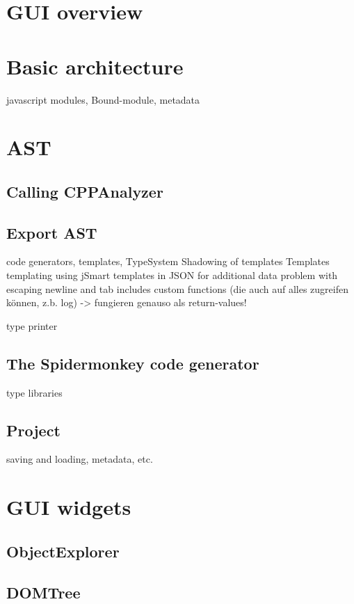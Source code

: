 \section{GUI overview}

\section{Basic architecture}

javascript modules, Bound-module, metadata

\section{ AST}
\subsection{Calling CPPAnalyzer}


\subsection{Export AST}

code generators, templates, 
    TypeSystem
        Shadowing of templates
    Templates
        templating using jSmart
        templates in JSON for additional data
        problem with escaping newline and tab
        includes
        custom functions (die auch auf alles zugreifen können, z.b. log) -> fungieren genauso als return-values!

type printer
\subsection{The Spidermonkey code generator}

type libraries

\subsection{Project}

saving and loading, metadata, etc.

\section{GUI widgets}

\subsection{ObjectExplorer}

\subsection{DOMTree}


